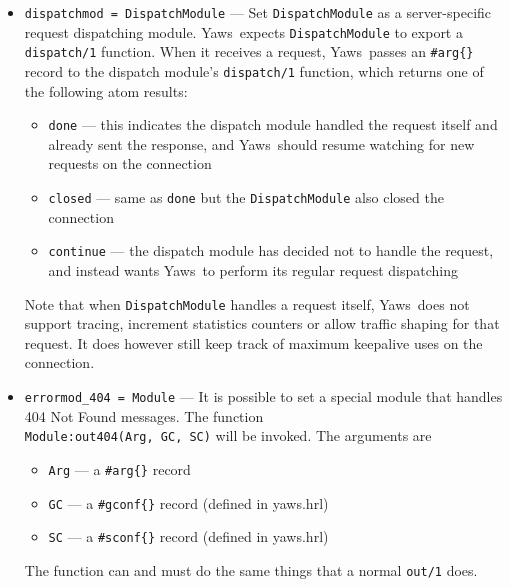 \documentclass[11pt,oneside,english]{book}
\newcommand{\Yaws}            %
        {{\sc Yaws}}
\begin{document}
\begin{itemize}
\item       \verb+dispatchmod = DispatchModule+ ---
              Set \verb+DispatchModule+ as a server-specific request
              dispatching module. \Yaws\  expects \verb+DispatchModule+ to
              export a \verb+dispatch/1+ function. When it receives a
              request, \Yaws\  passes an \verb+#arg{}+ record to the dispatch
              module's \verb+dispatch/1+ function, which returns one of the
              following atom results:
              \begin{itemize}
                \item \verb+done+ --- this indicates the dispatch module
                  handled the request itself and already sent the response,
                  and \Yaws\  should resume watching for new requests on the
                  connection
                \item \verb+closed+ --- same as \verb+done+ but the
                  \verb+DispatchModule+ also closed the connection
                \item \verb+continue+ --- the dispatch module has decided
                  not to handle the request, and instead wants \Yaws\  to
                  perform its regular request dispatching
              \end{itemize}
              Note that when \verb+DispatchModule+ handles a request itself,
              \Yaws\  does not support tracing, increment statistics
              counters or allow traffic shaping for that request. It does
              however still keep track of maximum keepalive uses on the
              connection.

\item       \verb+errormod_404 = Module+ ---
              It is possible to set a special module that handles 404 Not Found
              messages. The function\\ \verb+Module:out404(Arg, GC, SC)+ will be
              invoked. The arguments are
              \begin{itemize}
              \item \verb+Arg+ --- a \verb+#arg{}+ record
              \item \verb+GC+ --- a \verb+#gconf{}+ record (defined in yaws.hrl)
              \item \verb+SC+ --- a \verb+#sconf{}+ record (defined in yaws.hrl)
              \end{itemize}
              The function can and must do the same things that a normal
              \verb+out/1+ does.


\end{itemize}
\end{document}
